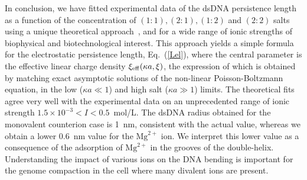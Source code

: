 \documentclass[aps,pre,twocolumn]{revtex4}
\def\eq#1{Eq.~(\ref{#1})}
\begin{document}
In conclusion, we have fitted experimental data of the dsDNA persistence length as a function of the concentration of $(1:1),(2:1),(1:2)$ and $(2:2)$ salts using a unique theoretical approach~\cite{TS}, and for a wide range of ionic strengths of biophysical and biotechnological interest. This approach yields a simple formula for the electrostatic persistence length, \eq{Lel}, where the central parameter is the effective linear charge density $\xi_{\rm eff}(\kappa a, \xi)$, the expression of which is obtained by matching exact asymptotic solutions of the non-linear Poisson-Boltzmann equation, in the low ($\kappa a\ll 1$) and high salt ($\kappa a\gg 1$) limits. The theoretical fits agree very well with the experimental data on an unprecedented range of ionic strength $1.5\times 10^{-3}<I<0.5$~mol/L. The dsDNA radius obtained for the monovalent counterion case is 1~nm, consistent with the actual value, whereas we obtain a lower 0.6~nm value for the $\mathrm{Mg}^{2+}$ ion. We interpret this lower value as a consequence of the adsorption of $\mathrm{Mg}^{2+}$ in the grooves of the double-helix. Understanding the impact of various ions on the DNA bending is important for the genome compaction in the cell where many divalent ions are present.
\end{document}
